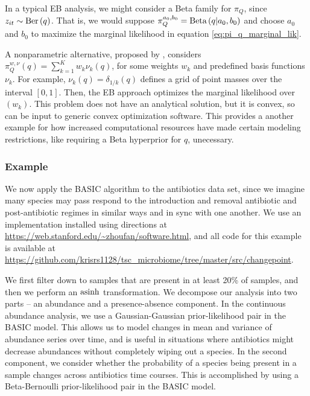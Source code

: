 \documentclass{article}
\begin{document}
In a typical EB analysis, we might consider a Beta family for $\pi_{Q}$, since
$z_{it} \sim \textnormal{Ber}\left(q\right)$. That is, we would suppose $\pi_{Q}^{a_0, b_0}
= \textnormal{Beta}\left(q \vert a_{0}, b_{0}\right)$ and choose $a_{0}$ and $b_0$ to
maximize the marginal likelihood in equation \ref{eq:pi_q_marginal_lik}.

A nonparametric alternative, proposed by \citep{fan2015empirical}, considers
$\pi_{Q}^{w, \nu}\left(q\right) = \sum_{k = 1}^{K} w_{k} \nu_{k}\left(q\right)$,
for some weights $w_{k}$ and predefined basis functions $\nu_{k}$. For example,
$\nu_{k}\left(q\right) = \delta_{1 / k}\left(q\right)$ defines a grid of point
masses over the interval $\left[0, 1\right]$. Then, the EB approach optimizes
the marginal likelihood over $\left(w_k\right)$. This problem does not have an
analytical solution, but it is convex, so can be input to generic convex
optimization software. This provides a another example for how increased
computational resources have made certain modeling restrictions, like requiring
a Beta hyperprior for $q$, unecessary.


\subsubsection{Example}
\label{subsec:basic_example}

We now apply the BASIC algorithm to the antibiotics data set, since we imagine
many species may pass respond to the introduction and removal antibiotic and
post-antibiotic regimes in similar ways and in sync with one another. We use an
implementation installed using directions at
\url{https://web.stanford.edu/~zhoufan/software.html}, and all code for this
example is available at
\url{https://github.com/krisrs1128/tsc_microbiome/tree/master/src/changepoint}.

We first filter down to samples that are present in at least 20\% of samples,
and then we perform an $\mathop\mathrm{asinh}$ transformation. We decompose our analysis into
two parts -- an abundance and a presence-absence component. In the continuous
abundance analysis, we use a Gaussian-Gaussian prior-likelihood pair in the
BASIC model. This allows us to model changes in mean and variance of abundance
series over time, and is useful in situations where antibiotics might decrease
abundances without completely wiping out a species. In the second component, we
consider whether the probability of a species being present in a sample changes
across antibiotics time courses. This is accomplished by using a Beta-Bernoulli
prior-likelihood pair in the BASIC model.
\end{document}
